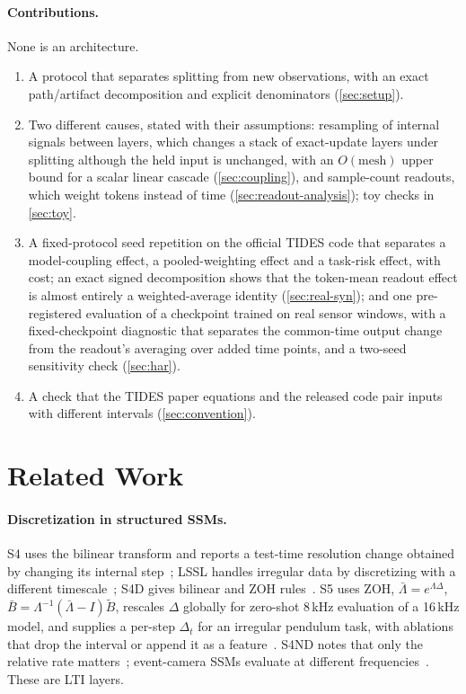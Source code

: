 \documentclass{article}
\theoremstyle{plain}
\theoremstyle{definition}
\theoremstyle{remark}
\begin{document}
\paragraph{Contributions.}
None is an architecture.
\begin{enumerate}
  \item A protocol that separates splitting from new observations, with an exact path/artifact decomposition and explicit denominators (\cref{sec:setup}).
  \item Two different causes, stated with their assumptions: resampling of internal signals between layers, which changes a stack of exact-update layers under splitting although the held input is unchanged, with an $O(\text{mesh})$ upper bound for a scalar linear cascade (\cref{sec:coupling}), and sample-count readouts, which weight tokens instead of time (\cref{sec:readout-analysis}); toy checks in \cref{sec:toy}.
  \item A fixed-protocol seed repetition on the official TIDES code that separates a model-coupling effect, a pooled-weighting effect and a task-risk effect, with cost; an exact signed decomposition shows that the token-mean readout effect is almost entirely a weighted-average identity (\cref{sec:real-syn}); and one pre-registered evaluation of a checkpoint trained on real sensor windows, with a fixed-checkpoint diagnostic that separates the common-time output change from the readout's averaging over added time points, and a two-seed sensitivity check (\cref{sec:har}).
  \item A check that the TIDES paper equations and the released code pair inputs with different intervals (\cref{sec:convention}).
\end{enumerate}

\section{Related Work}
\label{sec:related}

\paragraph{Discretization in structured SSMs.}
S4 uses the bilinear transform and reports a test-time resolution change obtained by changing its internal step~\citep{gu2021s4}; LSSL handles irregular data by discretizing with a different timescale~\citep{gu2021lssl}; S4D gives bilinear and ZOH rules~\citep{gu2022s4d}.
S5 uses ZOH, $\bar\Lambda=e^{\Lambda\Delta}$, $\bar B=\Lambda^{-1}(\bar\Lambda-I)\tilde B$, rescales $\Delta$ globally for zero-shot 8\,kHz evaluation of a 16\,kHz model, and supplies a per-step $\Delta_t$ for an irregular pendulum task, with ablations that drop the interval or append it as a feature~\citep{smith2022s5}.
S4ND notes that only the relative rate matters~\citep{nguyen2022s4nd}; event-camera SSMs evaluate at different frequencies~\citep{zubic2024event}.
These are LTI layers.
\end{document}
